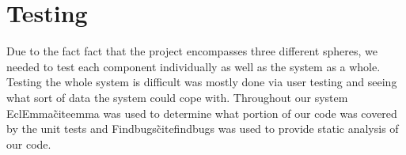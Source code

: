 \section{Testing}

Due to the fact fact that the project encompasses three different spheres, we
needed to test each component individually as well as the system as a whole. 
Testing the whole system is difficult was mostly done via user testing and
seeing what sort of data the system could cope with. Throughout our
system EclEmma\~cite{emma} was used to determine what portion
of our code was covered by the unit tests and Findbugs\~cite{findbugs} was used to provide static
analysis of our code.



